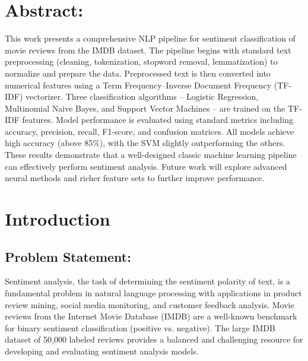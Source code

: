 \documentclass{article}
\begin{document}
\section{Abstract:}
This work presents a comprehensive NLP pipeline for sentiment classification of movie reviews from the IMDB dataset. The pipeline begins with standard text preprocessing (cleaning, tokenization, stopword removal, lemmatization) to normalize and prepare the data. Preprocessed text is then converted into numerical features using a Term Frequency–Inverse Document Frequency (TF-IDF) vectorizer. Three classification algorithms – Logistic Regression, Multinomial Naive Bayes, and Support Vector Machines – are trained on the TF-IDF features. Model performance is evaluated using standard metrics including accuracy, precision, recall, F1-score, and confusion matrices. All models achieve high accuracy (above 85\%), with the SVM slightly outperforming the others. These results demonstrate that a well-designed classic machine learning pipeline can effectively perform sentiment analysis. Future work will explore advanced neural methods and richer feature sets to further improve performance.

\section{Introduction}
\subsection{Problem Statement:}
Sentiment analysis, the task of determining the sentiment polarity of text, is a fundamental problem in natural language processing with applications in product review mining, social media monitoring, and customer feedback analysis. Movie reviews from the Internet Movie Database (IMDB) are a well-known benchmark for binary sentiment classification (positive vs. negative). The large IMDB dataset of 50,000 labeled reviews provides a balanced and challenging resource for developing and evaluating sentiment analysis models.
\end{document}
